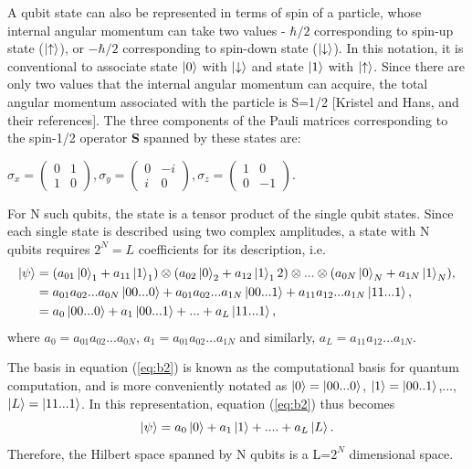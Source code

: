 \documentclass[12]{article}
\begin{document}
A qubit state can also be represented in terms of spin of a particle, whose internal angular momentum can take two values - $\hbar/2$ corresponding to spin-up state ($\ket{\uparrow}$), or $-\hbar/2$ corresponding to spin-down state ($\ket{\downarrow}$). In this notation, it is conventional to associate state $\ket{0}$ with $\ket{\downarrow}$ and state $\ket{1}$ with $\ket{\uparrow}$. Since there are only two values that the internal angular momentum can acquire, the total angular momentum associated with the particle is S=1/2 [Kristel and Hans, and their references]. The three components of the Pauli matrices corresponding to the spin-1/2 operator \textbf{S} spanned by these states are:
\begin{center}
$ \sigma_x= \begin{pmatrix}
0 & 1\\
1 & 0
\end{pmatrix}, \sigma_y= \begin{pmatrix}
0 & -i\\
i & 0
\end{pmatrix}, \sigma_z= \begin{pmatrix}
1 & 0\\
0 & -1
\end{pmatrix}.
$\\
\end{center}
For N such qubits, the state is a tensor product of the single qubit states. Since each single state is described using two complex amplitudes, a state with N qubits requires $2^N=L$ coefficients for its description, i.e. 
\begin{equation}
\begin{split}
\ket{\psi} &= (a_{01}\ket{0}_1+a_{11}\ket{1}_1)\otimes(a_{02}\ket{0}_2+a_{12}\ket{1}_12)\otimes...\otimes(a_{0N}\ket{0}_N+a_{1N}\ket{1}_N),\\ 
		  &=a_{01}a_{02}...a_{0N}\ket{00...0}+a_{01}a_{02}...a_{1N}\ket{00...1}+a_{11}a_{12}...a_{1N}\ket{11...1},\\
		  &=a_0 \ket{00...0}+a_1 \ket{00...1}+...+a_L \ket{11...1},\\ \label{eq:b2}
\end{split}
\end{equation}
where $a_0=a_{01}a_{02}...a_{0N}$, $a_1=a_{01}a_{02}...a_{1N}$ and similarly, $a_L=a_{11}a_{12}...a_{1N}$.

The basis in equation (\ref{eq:b2}) is known as the computational basis for quantum computation, and is more conveniently notated as $\ket{0}=\ket{00...0}$, $\ket{1}=\ket{00..1}$,..., $\ket{L}=\ket{11...1}$. In this representation, equation (\ref{eq:b2}) thus becomes
\begin{equation}
\ket{\psi}= a_0\ket{0}+a_1\ket{1}+....+a_L\ket{L}.  \label{eq:b3}
\end{equation}
Therefore, the Hilbert space spanned by N qubits is a L=$2^N$ dimensional space.
\end{document}
